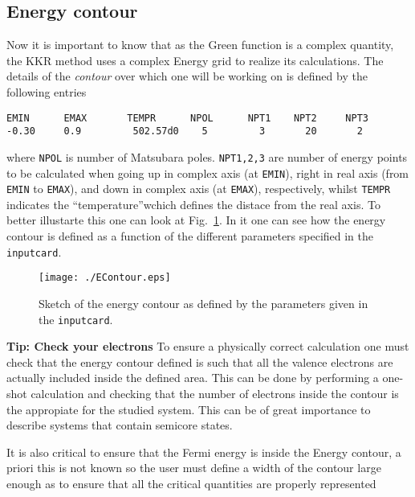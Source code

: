 \documentclass[11pt,fleqn]{book} %
\begin{document}
\subsection{Energy contour}
Now it is important to know that as the Green function is a complex quantity, the KKR method uses a complex Energy grid to realize its calculations. The details of the \textit{contour} over which one will be working on is defined by the following entries
\begin{VBox}
\begin{verbatim}
EMIN      EMAX       TEMPR      NPOL      NPT1    NPT2     NPT3
-0.30     0.9         502.57d0    5         3       20       2
\end{verbatim}
\end{VBox}
where \verb;NPOL; is number of Matsubara poles. \verb;NPT1,2,3; are number of energy points to be calculated when going up in complex axis (at \verb;EMIN;), right in real axis (from \verb;EMIN; to \verb;EMAX;), and down in complex axis (at \verb;EMAX;), respectively, whilst \verb;TEMPR; indicates the \textquotedblleft temperature\textquotedblright wchich defines the distace from the real axis. To better illustarte this one can look at Fig.~\ref{fig:EContour}. In it one can see how the energy contour is defined as a function of the different parameters specified in the \verb;inputcard;.

\begin{figure}
\centering
\texttt{[image: ./EContour.eps]}
\caption{Sketch of the energy contour as defined by the parameters given in the \texttt{inputcard}.\label{fig:EContour}}
\end{figure}


\begin{fBox}

{\Large{\textbf{\sffamily\textcolor{FZJTeal}{Tip: Check your electrons}}}}
To ensure a physically correct calculation one must check that the energy contour defined is such that all the valence electrons are actually included inside the defined area. This can be done by performing a one-shot calculation and checking that the number of electrons inside the contour is the appropiate for the studied system. This can be of great importance to describe systems that contain semicore states.

It is also critical to ensure that the Fermi energy is inside the Energy contour, a priori this is not known so the user must define a width of the contour large enough as to ensure that all the critical quantities are properly represented
\end{fBox} 
\end{document}
